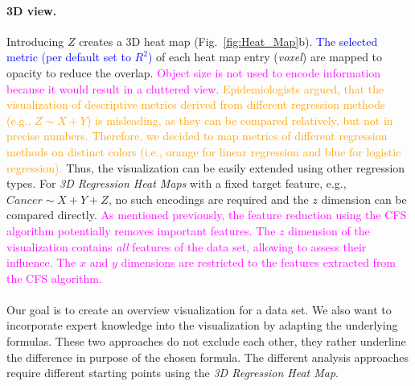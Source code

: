 \documentclass[journal]{style/vgtc} 			          %
\newcommand{\add}[1]{\textcolor{blue}{#1}}
\newcommand{\design}[1]{\textcolor{orange}{#1}}
\newcommand{\magenta}[1]{\textcolor{magenta}{#1}}
\begin{document}
\paragraph{3D view.}
Introducing $Z$ creates a 3D heat map (Fig.~\ref{fig:Heat_Map}b).
\add{The selected metric (per default set to $R^2$)} of each heat map entry (\emph{voxel}) are mapped to opacity to reduce the overlap.
\magenta{Object size is not used to encode information because it would result in a cluttered view.}
\design{
Epidemiologists argued, that the visualization of descriptive metrics derived from different regression methods (e.g., $Z \sim X + Y$) is misleading, as they can be compared relatively, but not in precise numbers.
Therefore, we decided to map metrics of different regression methods on distinct colors (i.e., orange for linear regression and blue for logistic regression).
}
Thus, the visualization can be easily extended using other regression types.
For \emph{3D Regression Heat Maps} with a fixed target feature, e.g., $Cancer \sim X + Y + Z$, no such encodings are required and the $z$ dimension can be compared directly.
\magenta{
As mentioned previously, the feature reduction using the CFS algorithm potentially removes important features. %
The $z$ dimension of the visualization contains \emph{all} features of the data set, allowing to assess their influence.
The $x$ and $y$ dimensions are restricted to the features extracted from the CFS algorithm.
}
\\\\
Our goal is to create an overview visualization for a data set.
We also want to incorporate expert knowledge into the visualization by adapting the underlying formulas.
These two approaches do not exclude each other, they rather underline the difference in purpose of the chosen formula.
The different analysis approaches require different starting points using the \emph{3D Regression Heat Map}.
\end{document}
